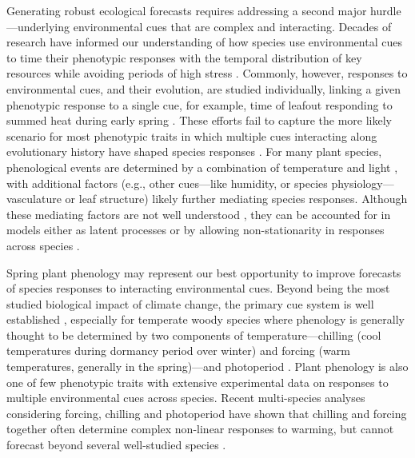 \documentclass[11pt]{article}
\begin{document}
Generating robust ecological forecasts requires addressing a second major hurdle---underlying environmental cues that are complex and interacting. Decades of research have informed our understanding of how species use environmental cues to time their phenotypic responses with the temporal distribution of key resources while avoiding periods of high stress \citep{larcher1980,bonamour2019}. Commonly, however, responses to environmental cues, and their evolution, are studied individually, linking a given phenotypic response to a single cue, for example, time of leafout responding to summed heat during early spring \citep{davies2013phylogenetic}. These efforts fail to capture the more likely scenario for most phenotypic traits in which multiple cues interacting along evolutionary history have shaped species responses \citep{Ackerly:2009ly}. For many plant species, phenological events are determined by a combination of temperature and light \citep{chuinearees}, with additional factors (e.g., other cues---like humidity, or species physiology---vasculature or leaf structure) likely further mediating species responses. Although these mediating factors are not well understood \citep{chuinearees}, they can be accounted for in models either as latent processes or by allowing non-stationarity in responses across species \citep{davies2019phylogenetically}.  

Spring plant phenology may represent our best opportunity to improve forecasts of species responses to interacting environmental cues. Beyond being the most studied biological impact of climate change, the primary cue system is well established \citep{chuinearees}, especially for temperate woody species where phenology is generally thought to be determined by two components of temperature---chilling (cool temperatures during dormancy period over winter) and forcing (warm temperatures, generally in the spring)---and photoperiod \citep{ospreephoto}. Plant phenology is also one of few phenotypic traits with extensive experimental data on responses to multiple environmental cues across species. %
Recent multi-species analyses considering forcing, chilling and photoperiod have shown that chilling and forcing together often determine complex non-linear responses to warming, but cannot forecast beyond several well-studied species \citep{ettinger2020}. 
\end{document}
